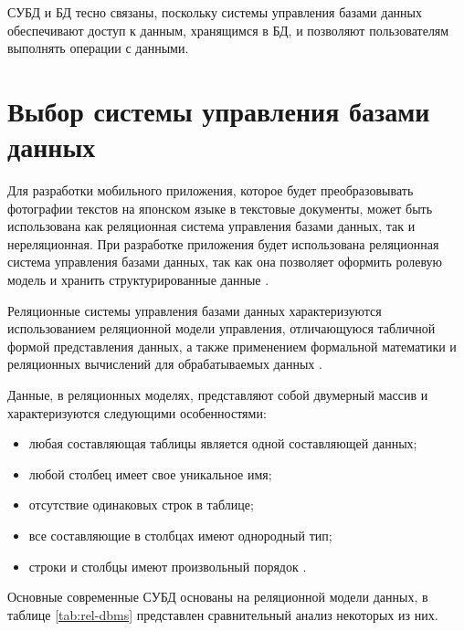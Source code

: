 СУБД и БД тесно связаны, поскольку системы управления базами
данных обеспечивают доступ к данным, хранящимся в БД, и позволяют
пользователям выполнять операции с данными.

\section{Выбор системы управления базами данных}

Для разработки мобильного приложения, которое будет преобразовывать
фотографии текстов на японском языке в текстовые документы,
может быть использована как реляционная система управления
базами данных, так и нереляционная. При разработке приложения
будет использована реляционная система управления базами данных,
так как она позволяет оформить ролевую модель и хранить структурированные
данные \cite{nosql}.

Реляционные системы управления базами данных характеризуются
использованием реляционной модели управления, отличающуюся
табличной формой представления данных, а также применением
формальной математики и реляционных вычислений для обрабатываемых
данных \cite{bdbms}.

Данные, в реляционных моделях, представляют собой двумерный
массив и характеризуются следующими особенностями:

\begin{itemize}[label={$-$}]
  \item любая составляющая таблицы является одной
составляющей данных;
  \item любой столбец имеет свое уникальное имя;
  \item отсутствие одинаковых строк в таблице;
  \item все составляющие в столбцах имеют однородный тип;
  \item строки и столбцы имеют произвольный порядок \cite{relational-dbms}.
\end{itemize}

Основные современные СУБД основаны на реляционной модели данных,
в таблице \ref{tab:rel-dbms} представлен сравнительный анализ
некоторых из них.

\clearpage

